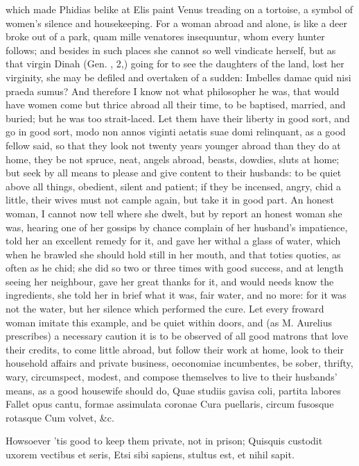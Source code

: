 {which made Phidias belike at Elis paint Venus treading on a tortoise, a
symbol of women's silence and housekeeping. For a woman abroad and
alone, is like a deer broke out of a park, quam mille venatores
insequuntur, whom every hunter follows; and besides in such places she
cannot so well vindicate herself, but as that virgin Dinah (Gen.
, 2,) going for to see the daughters of the land, lost her
virginity, she may be defiled and overtaken of a sudden: Imbelles damae
quid nisi praeda sumus? 
And therefore I know not what philosopher he was, that would have women
come but thrice abroad all their time, to be baptised, married,
and buried; but he was too strait-laced. Let them have their liberty in
good sort, and go in good sort, modo non annos viginti aetatis suae
domi relinquant, as a good fellow said, so that they look not twenty
years younger abroad than they do at home, they be not spruce, neat,
angels abroad, beasts, dowdies, sluts at home; but seek by all means to
please and give content to their husbands: to be quiet above all
things, obedient, silent and patient; if they be incensed, angry, chid
a little, their wives must not cample again, but take it in good
part. An honest woman, I cannot now tell where she dwelt, but by report
an honest woman she was, hearing one of her gossips by chance complain
of her husband's impatience, told her an excellent remedy for it, and
gave her withal a glass of water, which when he brawled she should hold
still in her mouth, and that toties quoties, as often as he chid; she
did so two or three times with good success, and at length seeing her
neighbour, gave her great thanks for it, and would needs know the
ingredients, she told her in brief what it was, fair water, and
no more: for it was not the water, but her silence which performed the
cure. Let every froward woman imitate this example, and be quiet within
doors, and (as M. Aurelius prescribes) a necessary caution it is
to be observed of all good matrons that love their credits, to come
little abroad, but follow their work at home, look to their household
affairs and private business, oeconomiae incumbentes, be sober,
thrifty, wary, circumspect, modest, and compose themselves to live to
their husbands' means, as a good housewife should do,
Quae studiis gavisa coli, partita labores
Fallet opus cantu, formae assimulata coronae
Cura puellaris, circum fusosque rotasque
Cum volvet, \&c.

Howsoever 'tis good to keep them private, not in prison;
Quisquis custodit uxorem vectibus et seris,
Etsi sibi sapiens, stultus est, et nihil sapit.

}
